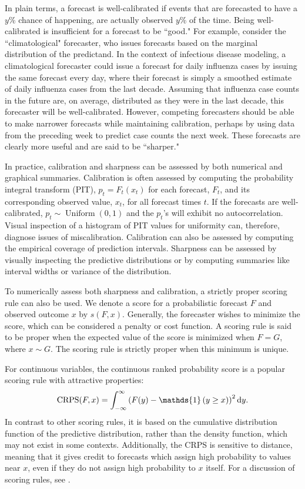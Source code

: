 In plain terms, a forecast is well-calibrated if events that are forecasted to have a \( y \)\% chance of happening, are actually observed \( y \)\% of the time.
Being well-calibrated is insufficient for a forecast to be ``good."
For example, consider the ``climatological" forecaster, who issues forecasts based on the marginal distribution of the predictand.
In the context of infectious disease modeling, a climatological forecaster could issue a forecast for daily influenza cases by issuing the same forecast every day, where their forecast is simply a smoothed estimate of daily influenza cases from the last decade.
Assuming that influenza case counts in the future are, on average, distributed as they were in the last decade, this forecaster will be well-calibrated.
However, competing forecasters should be able to make narrower forecasts while maintaining calibration, perhaps by using data from the preceding week to predict case counts the next week.
These forecasts are clearly more useful and are said to be ``sharper."

In practice, calibration and sharpness can be assessed by both numerical and graphical summaries.
Calibration is often assessed by computing the probability integral transform (PIT), \( p_t = F_t(x_t) \) for each forecast, \( F_t \), and its corresponding observed value, \( x_t \), for all forecast times \( t \).
If the forecasts are well-calibrated, \( p_t \sim \operatorname{Uniform}(0,1) \) and the \( p_t \)'s will exhibit no autocorrelation.
Visual inspection of a histogram of PIT values for uniformity can, therefore, diagnose issues of miscalibration.
Calibration can also be assessed by computing the empirical coverage of prediction intervals.
Sharpness can be assessed by visually inspecting the predictive distributions or by computing summaries like interval widths or variance of the distribution.

To numerically assess both sharpness and calibration, a strictly proper scoring rule can also be used.
We denote a score for a probabilistic forecast \( F \) and observed outcome \( x \) by \( s(F, x) \).
Generally, the forecaster wishes to minimize the score, which can be considered a penalty or cost function.
A scoring rule is said to be proper when the expected value of the score is minimized when \( F = G \), where $x \sim G$.
The scoring rule is strictly proper when this minimum is unique.

For continuous variables, the continuous ranked probability score is a popular scoring rule with attractive properties:
\begin{equation}
    \operatorname{CRPS}(F, x) = \int_{-\infty}^{\infty} \left( F(y) - \mathds{1} \left( y \geq x \right) \right)^2 \rmd y.
    \label{ch_2:eqn:crps}
\end{equation}
In contrast to other scoring rules, it is based on the cumulative distribution function of the predictive distribution, rather than the density function, which may not exist in some contexts.
Additionally, the CRPS is sensitive to distance, meaning that it gives credit to forecasts which assign high probability to values near \( x \), even if they do not assign high probability to \( x \) itself.
For a discussion of scoring rules, see \citet{gneiting2007strictly}.

